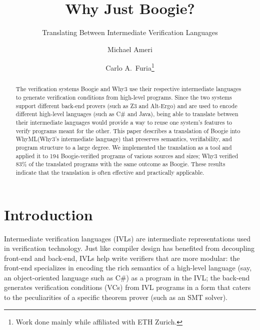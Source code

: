 \documentclass[a4paper,final]{llncs}
\newcommand{\Boogie}{Boogie\xspace}
\newcommand{\WhyML}{WhyML\xspace}
\newcommand{\Why}{Why3\xspace}
\begin{document}
\title{Why Just Boogie?}
\subtitle{Translating Between Intermediate Verification Languages}

\author{Michael Ameri \and Carlo A.\ Furia\thanks{Work done mainly while affiliated with ETH Zurich.}}


\maketitle

\begin{abstract}
The verification systems \Boogie and \Why use their respective intermediate languages 
to generate verification conditions from high-level programs.
Since the two systems support different back-end provers (such as Z3 and Alt-Ergo) and are used to encode different high-level languages (such as C\# and Java), being able to translate between their intermediate languages would provide a way to reuse one system's features to verify programs meant for the other.
This paper describes a translation of \Boogie into \WhyML (\Why's intermediate language) that preserves semantics, verifiability, and program structure to a large degree.
We implemented the translation as a tool and applied it to 194 \Boogie-verified programs of various sources and sizes; \Why verified 83\% of the translated programs with the same outcome as \Boogie.
These results indicate that the translation is often effective and practically applicable.
\end{abstract}




\section{Introduction}\label{sec:intro}


Intermediate verification languages (IVLs) are intermediate representations used in verification technology.
Just like compiler design has benefited from decoupling front-end and back-end, IVLs help write verifiers that are more modular: the front-end specializes in encoding the rich semantics of a high-level language (say, an object-oriented language such as C\#) as a program in the IVL; the back-end generates verification conditions (VCs) from IVL programs in a form that caters to the peculiarities of a specific theorem prover (such as an SMT solver).
\end{document}
